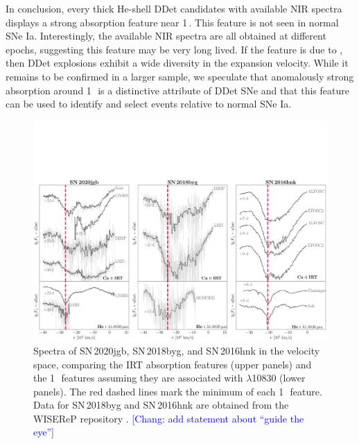\documentclass[twocolumn]{aastex631}
\newcommand{\sn}{SN\,2020jgb}
\newcommand{\chang}[1]{\textcolor{blue}{[Chang: #1]}}
\begin{document}
In conclusion, every thick He-shell DDet candidates with available NIR spectra displays a strong absorption feature near 1\,\micron. This feature is not seen in normal SNe Ia. Interestingly, the available NIR spectra are all obtained at different epochs, suggesting this feature may be very long lived. If the feature is due to , then DDet explosions exhibit a wide diversity in the expansion velocity. While it remains to be confirmed in a larger sample, we speculate that anomalously strong absorption around 1\,\micron\ is a distinctive attribute of DDet SNe and that this feature can be used to identify and select events relative to normal SNe Ia.

\begin{figure}
    \centering
    \includegraphics[width=\textwidth]{CaII_HeI_hvf.pdf}
    \caption{Spectra of \sn, SN\,2018byg, and SN\,2016hnk in the velocity space, comparing the  IRT absorption features (upper panels) and the 1\,\micron\ features assuming they are associated with  $\lambda$10830 (lower panels). The red dashed lines mark the minimum of each 1\,\micron\ feature. Data for SN\,2018byg and SN\,2016hnk are obtained from the WISEReP repository \citep{wiserep_2012}. \chang{add statement about ``guide the eye''}}
    \label{fig:hvf_comp}
\end{figure}
\end{document}
